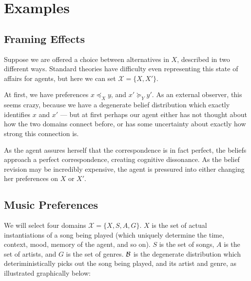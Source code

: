 \documentclass{book}
\newcommand\geqc{\succcurlyeq}
\newcommand\leqc{\preccurlyeq}
\begin{document}
	\section{Examples}
	\subsection{Framing Effects}
	Suppose we are offered a choice between alternatives in $X$, described in two different ways. Standard theories have difficulty even representing this state of affairs for agents, but here we can set $\mathcal X = \{ X, X'\}$. 
	
	At first, we have preferences $x \leqc_X y$, and $x' \geqc_Y y'$. As an external observer, this seems crazy, because we have a degenerate belief distribution which exactly identifies $x$ and $x'$ --- but at first perhaps our agent either has not thought about how the two domains connect before, or has some uncertainty about exactly how strong this connection is.
	
	As the agent assures herself that the correspondence is in fact perfect, the beliefs approach a perfect correspondence, creating cognitive dissonance. As the belief revision may be incredibly expensive, the agent is pressured into either changing her preferences on $X$ or $X'$.
	
	\subsection{Music Preferences}
	We will select four domains $\mathcal X = \{ X, S, A, G\}$. $X$ is the set of actual instantiations of a song being played (which uniquely determine the time, context, mood, memory of the agent, and so on). $S$ is the set of songs, $A$ is the set of artists, and $G$ is the set of genres. $\cal B$ is the degenerate distribution which deteriministically picks out the song being played, and its artist and genre, as illustrated graphically below:
	
	\begin{center}
		\itshape
		\color{blue}
	\end{center}
	
\end{document}

